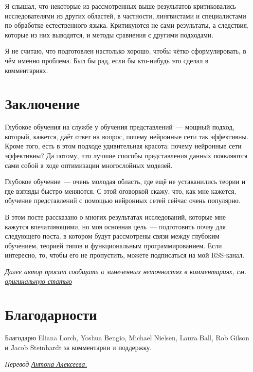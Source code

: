 \documentclass[a4paper,12pt]{article}
\begin{document}
Я слышал, что некоторые из рассмотренных выше результатов критиковались исследователями из других областей, в частности, лингвистами и специалистами по обработке естественного языка. Критикуются не сами результаты, а следствия, которые из них выводятся, и методы сравнения с другими подходами.

Я не считаю, что подготовлен настолько хорошо, чтобы чётко сформулировать, в чём именно проблема. Был бы рад, если бы кто-нибудь это сделал в комментариях.

\section*{Заключение}

Глубокое обучения на службе у обучения представлений~--- мощный подход, который, кажется, даёт ответ на вопрос, почему нейронные сети так эффективны. Кроме того, есть в этом подходе удивительная красота: почему нейронные сети эффективны? Да потому, что лучшие способы представления данных появляются сами собой в ходе оптимизации многослойных моделей.

Глубокое обучение~--- очень молодая область, где ещё не устаканились теории и где взгляды быстро меняются. С этой оговоркой скажу, что, как мне кажется, обучение представлений с помощью нейронных сетей сейчас очень популярно.

В этом посте рассказано о многих результатах исследований, которые мне кажутся впечатляющими, но моя основная цель~--- подготовить почву для следующего поста, в котором будут рассмотрены связи между глубоким обучением, теорией типов и функциональным программированием. Если интересно, то, чтобы его не пропустить, можете подписаться на мой RSS-канал.
 
{\it Далее автор просит сообщать о замеченных неточностях в комментариях, см. \href{http://colah.github.io/posts/2014-07-NLP-RNNs-Representations/}{оригинальную статью}} 
 
\section*{Благодарности}

Благодарю Eliana Lorch, Yoshua Bengio, Michael Nielsen, Laura Ball, Rob Gilson и Jacob Steinhardt за комментарии и поддержку.

\bigskip

{\it Перевод \href{http://www.stachek66.ru}{Антона Алексеева.}}

\end{document}
